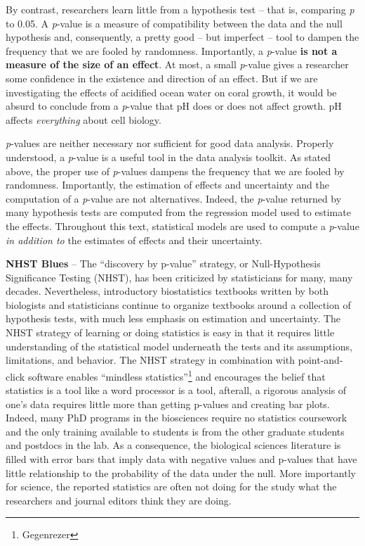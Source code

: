 \documentclass[]{book}
\let\rmarkdownfootnote\footnote%
\def\footnote{\protect\rmarkdownfootnote}
\begin{document}
By contrast, researchers learn little from a hypothesis test -- that is, comparing \emph{p} to 0.05. A \emph{p}-value is a measure of compatibility between the data and the null hypothesis and, consequently, a pretty good -- but imperfect -- tool to dampen the frequency that we are fooled by randomness. Importantly, a \emph{p}-value \textbf{is not a measure of the size of an effect}. At most, a small \emph{p}-value gives a researcher some confidence in the existence and direction of an effect. But if we are investigating the effects of acidified ocean water on coral growth, it would be absurd to conclude from a \emph{p}-value that pH does or does not affect growth. pH affects \emph{everything} about cell biology.

\emph{p}-values are neither necessary nor sufficient for good data analysis. Properly understood, a \emph{p}-value is a useful tool in the data analysis toolkit. As stated above, the proper use of \emph{p}-values dampens the frequency that we are fooled by randomness. Importantly, the estimation of effects and uncertainty and the computation of a \emph{p}-value are not alternatives. Indeed, the \emph{p}-value returned by many hypothesis tests are computed from the regression model used to estimate the effects. Throughout this text, statistical models are used to compute a \emph{p}-value \emph{in addition to} the estimates of effects and their uncertainty.

\textbf{NHST Blues} -- The ``discovery by p-value'' strategy, or Null-Hypothesis Significance Testing (NHST), has been criticized by statisticians for many, many decades. Nevertheless, introductory biostatistics textbooks written by both biologists and statisticians continue to organize textbooks around a collection of hypothesis tests, with much less emphasis on estimation and uncertainty. The NHST strategy of learning or doing statistics is easy in that it requires little understanding of the statistical model underneath the tests and its assumptions, limitations, and behavior. The NHST strategy in combination with point-and-click software enables ``mindless statistics''\footnote{Gegenrezer} and encourages the belief that statistics is a tool like a word processor is a tool, afterall, a rigorous analysis of one's data requires little more than getting p-values and creating bar plots. Indeed, many PhD programs in the biosciences require no statistics coursework and the only training available to students is from the other graduate students and postdocs in the lab. As a consequence, the biological sciences literature is filled with error bars that imply data with negative values and p-values that have little relationship to the probability of the data under the null. More importantly for science, the reported statistics are often not doing for the study what the researchers and journal editors think they are doing.
\end{document}
